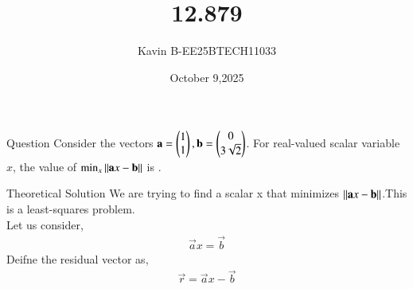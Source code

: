 \documentclass{beamer}
\begin{document}
\title 
{12.879}
\date{October 9,2025}


\author 
{Kavin B-EE25BTECH11033}






\frame{\titlepage}
\begin{frame}{Question}
Consider the vectors
$\mathbf{a} = \begin{pmatrix}1 \\ 1\end{pmatrix}, \mathbf{b} = \begin{pmatrix}0 \\ 3\sqrt{2}\end{pmatrix}$.
For real-valued scalar variable $x$, the value of
$\min_{x} \left\lVert\mathbf{a}x - \mathbf{b}\right\rVert$
is \underline{\hspace{1cm}}.\\    
\bigskip

\end{frame}



\begin{frame}{Theoretical Solution}
We are trying to find a scalar x that minimizes $\left\lVert\mathbf{a}x - \mathbf{b}\right\rVert$.This is a least-squares problem.\\

Let us consider,
\begin{align}
\vec{a}x = \vec{b}
\end{align}
Deifne the residual vector as,
\begin{align}
\vec{r} =\vec{a}x -  \vec{b} 
\end{align}\\

\end{frame}

\end{document}
